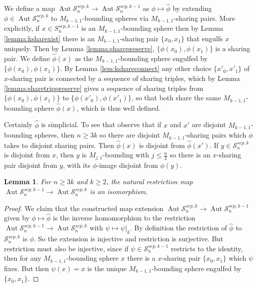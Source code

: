 \documentclass[11pt]{article}
\DeclareMathOperator{\aaut}{Aut}
\newtheorem{lemma}[theorem]{Lemma}
\theoremstyle{remark}
\theoremstyle{definition}
\begin{document}
We define a map $\aaut  \mathcal S^{sep,k}_n \to \aaut  \mathcal S^{sep,k-1}_n$
as $\phi \mapsto \hat \phi$ by extending $\phi \in \aaut  \mathcal S^{sep,k}_n$
to $M_{k-1,1}$-bounding spheres via $M_{k-1,1}$-sharing pairs.
More explicitly,
if $x \in S^{sep,k-1}_n$
is an $M_{k-1,1}$-bounding sphere
then by Lemma \ref{lemma:ksharexist}
there is an $M_{k-1,1}$-sharing pair $\{x_0,x_1\}$
that engulfs $x$ uniquely.
Then by Lemma \ref{lemma:sharepreserve},
$\{\phi(x_0),\phi(x_1)\}$
is a sharing pair.
We define $\hat \phi (x)$ as
the $M_{k-1,1}$-bounding sphere
engulfed by $\{\phi(x_0),\phi(x_1)\}$.
By Lemma \ref{lem:kshareconnect}
any other choice $\{x'_0,x'_1\}$
of $x$-sharing pair is connected by
a sequence of sharing triples,
which by Lemma \ref{lemma:sharetrippreserve}
gives a sequence of sharing triples from
$\{\phi(x_0),\phi(x_1)\}$ to $\{\phi(x'_0), \phi(x'_1)\}$,
so that both share the same $M_{k-1,1}$-bounding sphere $\hat \phi(x)$,
which is thus well defined.

Certainly $\hat \phi$ is simplicial.
To see that observe that
if $x$ and $x'$ are disjoint
$M_{k-1,1}$-bounding spheres,
then $n \geq 3k$ so there are disjoint
$M_{k-1,1}$-sharing pairs
which $\phi$ takes to disjoint sharing pairs.
Then $\hat \phi(x)$ is disjoint from $\hat \phi(x')$.
If $y\in \mathcal S^{sep,k}_n$ is disjoint from $x$,
then $y$ is $M_{j,1}$-bounding with $j \leq \frac n 2$
so there is an $x$-sharing pair disjoint from $y$,
with its $\phi$-image disjoint from $\phi(y)$.


\begin{lemma}
  For  $n\geq 3k$ and $k\geq 2$,
  the natural restriction map
   $\aaut  \mathcal S^{sep,k-1}_n \to \aaut  \mathcal S^{sep,k}_n$
   is an isomorphism.
\end{lemma}

\begin{proof}
 We claim that the constructed map
 extension $ \aaut  \mathcal S^{sep,k}_n \to \aaut  \mathcal S^{sep,k-1}_n $
 given by $\phi \mapsto \hat \phi$
 is the inverse homomorphism to the restriction
 $ \aaut  \mathcal S^{sep,k-1}_n \to \aaut  \mathcal S^{sep,k}_n $
 with
 $\psi \mapsto \psi|_{k}$.
 By definition the restriction of $\hat \phi$ to $\mathcal S^{sep,k}_n $
 is  $\phi$.
 So the extension is injective and restriction is surjective.
 But restriction must also be injective,
 since if $\psi \in \mathcal S^{sep,k-1}_n$
 restricts to the identity,
 then for any $M_{k-1,1}$-bounding sphere $x$
 there is a $x$-sharing pair $\{x_0,x_1\}$ which $\psi$ fixes.
 But then $\psi(x)=x$ is the unique  $M_{k-1,1}$-bounding sphere
 engulfed by $\{x_0,x_1\}$.
\end{proof}
\end{document}
